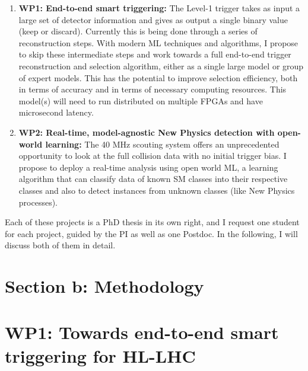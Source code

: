 \documentclass[12pt]{iopart}
\begin{document}
\begin{enumerate}
    \item \textbf{WP1: End-to-end smart triggering:} The Level-1 trigger takes as input a large set of detector information and gives as output a single binary value (keep or discard). Currently this is being done through a series of reconstruction steps. With modern ML techniques and algorithms, I propose to skip these intermediate steps and work towards a full end-to-end trigger reconstruction and selection algorithm, either as a single large model or group of expert models. This has the potential to improve selection efficiency, both in terms of accuracy and in terms of necessary computing resources. This model(s) will need to run distributed on multiple FPGAs and have microsecond latency.
    \item \textbf{WP2: Real-time, model-agnostic New Physics detection with open-world learning:} The 40 MHz scouting system offers an unprecedented opportunity to look at the full collision data with no initial trigger bias. I propose to deploy a real-time analysis using open world ML, a learning algorithm that can classify data of known SM classes into their respective classes and also to detect instances from unknown classes (like New Physics processes).
\end{enumerate}

\noindent Each of these projects is a PhD thesis in its own right, and I request one student for each project, guided by the PI as well as one Postdoc. In the following, I will discuss both of them in detail.


\section{Section b: Methodology}


\section{WP1: Towards end-to-end smart triggering for HL-LHC}
\end{document}

